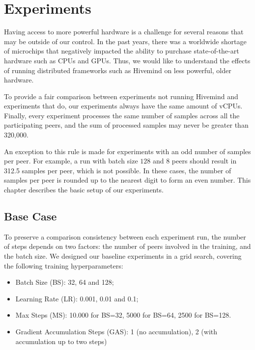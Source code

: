 \chapter{Experiments}\label{chapter:experiments}

Having access to more powerful hardware is a challenge for several reasons that may be outside of our control.
In the past years, there was a worldwide shortage of microchips that negatively impacted the ability to purchase state-of-the-art hardware such as CPUs and GPUs.
Thus, we would like to understand the effects of running distributed frameworks such as Hivemind on less powerful, older hardware.

To provide a fair comparison between experiments not running Hivemind and experiments that do, our experiments always have the same amount of vCPUs.
Finally, every experiment processes the same number of samples across all the participating peers, and the sum of processed samples may never be greater than 320,000.

An exception to this rule is made for experiments with an odd number of samples per peer.
For example, a run with batch size $128$ and 8 peers should result in 312.5 samples per peer, which is not possible.
In these cases, the number of samples per peer is rounded up to the nearest digit to form an even number.
This chapter describes the basic setup of our experiments.

\section{Base Case}

To preserve a comparison consistency between each experiment run, the number of steps depends on two factors: the number of peers involved in the training, and the batch size.
We designed our baseline experiments in a grid search, covering the following training hyperparameters:
\begin{itemize}
    \item Batch Size (BS): 32, 64 and 128;
    \item Learning Rate (LR): 0.001, 0.01 and 0.1;
    \item Max Steps (MS): 10.000 for BS=32, 5000 for BS=64, 2500 for BS=128.
    \item Gradient Accumulation Steps (GAS): 1 (no accumulation), 2 (with accumulation up to two steps)
\end{itemize}

